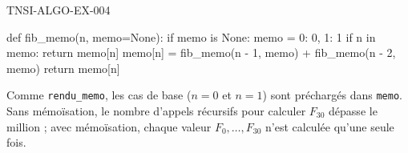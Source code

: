 \begin{corrige}{TNSI-ALGO-EX-004}
\begin{python}
def fib_memo(n, memo=None):
    if memo is None:
        memo = {0: 0, 1: 1}
    if n in memo:
        return memo[n]
    memo[n] = fib_memo(n - 1, memo) + fib_memo(n - 2, memo)
    return memo[n]
\end{python}
Comme \lstinline{rendu_memo}, les cas de base ($n=0$ et $n=1$) sont préchargés dans \lstinline{memo}. Sans mémoïsation, le nombre d'appels récursifs pour calculer $F_{30}$ dépasse le million ; avec mémoïsation, chaque valeur $F_0, \dots, F_{30}$ n'est calculée qu'une seule fois.
\end{corrige}
